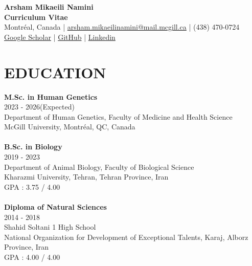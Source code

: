 \documentclass[a4paper,9pt]{extarticle}
\begin{document}
\pagestyle{empty}

\begin{center}
\textbf{\Large Arsham Mikaeili Namini }\\[7pt] %
\textbf{Curriculum Vitae}\\[3pt] %
Montréal, Canada | \href{mailto:arsham.mikaeilinamini@mail.mcgill.ca}{arsham.mikaeilinamini@mail.mcgill.ca} | (438) 470-0724 \\
\href{https://scholar.google.ca/citations?hl=en&pli=1&user=zoWS71IAAAAJ}{Google Scholar} | \href{https://github.com/Arshammik}{GitHub} | \href{https://www.linkedin.com/in/arsham-mikaeili-namini-a891ba186/}{Linkedin} %
\end{center}


\section*{EDUCATION}

\noindent
\newline
\textbf{M.Sc. in Human Genetics} \\
2023 - 2026(Expected) \\ 
Department of Human Genetics, Faculty of Medicine and Health Science  \\
McGill University, Montréal, QC, Canada \\ 
\\
\noindent
\textbf{B.Sc. in Biology} \\
2019 - 2023 \\ 
Department of Animal Biology, Faculty of Biological Science\\
Kharazmi University, Tehran, Tehran Province, Iran \\ 
GPA : 3.75 / 4.00\\
\\
\noindent
\textbf{Diploma of Natural Sciences} \\
2014 - 2018 \\ 
Shahid Soltani 1 High School\\ 
National Organization for Development of Exceptional Talents, Karaj, Alborz Province, Iran \\ 
GPA : 4.00 / 4.00\\


\end{document}
